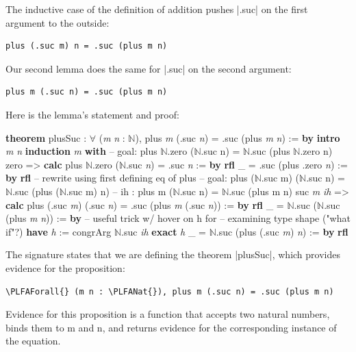 \documentclass{memoir}
\newcommand{\PLFANat}{\ensuremath{\mathbb{N}}}
\newcommand{\PLFAForall}{\ensuremath{\forall}}
\newcommand{\PLFAComment}[1]{\textcolor{codecomment}{#1}}
\begin{document}
\par
The inductive case of the definition of addition pushes \LeanVerb|.suc| on the first
argument to the outside:

\par
\par\noindent \begin{verbatim}
plus (.suc m) n = .suc (plus m n)
\end{verbatim}
Our second lemma does the same for \LeanVerb|.suc| on the second argument:\begin{verbatim}
plus m (.suc n) = .suc (plus m n)
\end{verbatim}
Here is the lemma's statement and proof:\begin{LeanVerbatim}
\textbf{theorem} plusSuc : \PLFAForall{} (\textit{m} \textit{n} : \PLFANat{}), plus \textit{m} (.suc \textit{n}) = .suc (plus \textit{m} \textit{n}) := \textbf{by}
    \textbf{intro} \textit{m} \textit{n}
    \textbf{induction} \textit{m} \textbf{with}
    \PLFAComment{-- goal: plus \PLFANat{}.zero (\PLFANat{}.suc n) = \PLFANat{}.suc (plus \PLFANat{}.zero n)}
     zero =>
        \textbf{calc}
            plus \PLFANat{}.zero (\PLFANat{}.suc \textit{n})
            = .suc \textit{n}                  := \textbf{by} \textbf{rfl}
          _ = .suc (plus .zero \textit{n})     := \textbf{by} \textbf{rfl} \PLFAComment{-- rewrite using first defining eq of plus}
    \PLFAComment{-- goal: plus (\PLFANat{}.suc m) (\PLFANat{}.suc n) = \PLFANat{}.suc (plus (\PLFANat{}.suc m) n)}
    \PLFAComment{-- ih  : plus m (\PLFANat{}.suc n) = \PLFANat{}.suc (plus m n)}
     suc \textit{m} \textit{ih} =>
        \textbf{calc}
            plus (.suc \textit{m}) (.suc \textit{n})
            = .suc (plus \textit{m} (.suc \textit{n})) := \textbf{by}
                \textbf{rfl}
          _ = \PLFANat{}.suc (\PLFANat{}.suc (plus \textit{m} \textit{n})) := \textbf{by}
                \PLFAComment{-- useful trick w/ hover on h for}
                \PLFAComment{-- examining type shape ("what if"?)}
                \textbf{have} \textit{h} := congrArg \PLFANat{}.suc \textit{ih}
                \textbf{exact} \textit{h}
          _ = \PLFANat{}.suc (plus (.suc \textit{m}) \textit{n}) := \textbf{by}
                \textbf{rfl}
\end{LeanVerbatim}
The signature states that we are defining the theorem \LeanVerb|plusSuc|, which provides
evidence for the proposition:\begin{verbatim}
\PLFAForall{} (m n : \PLFANat{}), plus m (.suc n) = .suc (plus m n)
\end{verbatim}
Evidence for this proposition is a function that accepts two natural numbers,
binds them to m and n, and returns evidence for the corresponding instance of
the equation.
\end{document}
